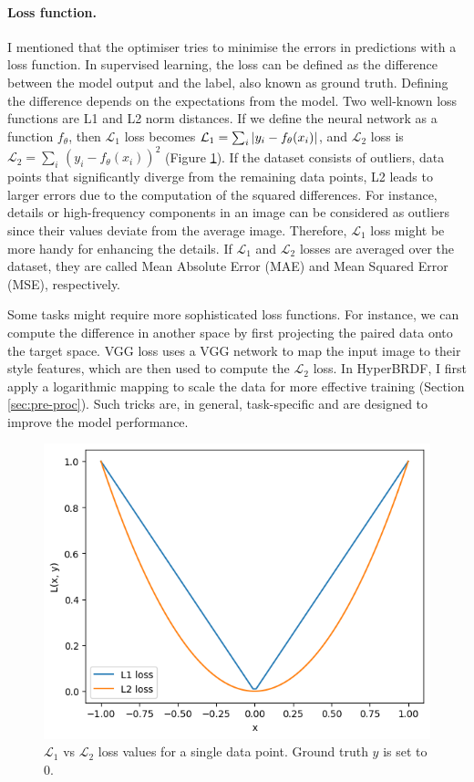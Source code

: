 \paragraph{Loss function.} I mentioned that the optimiser tries to minimise the errors in predictions with a loss function. In supervised learning, the loss can be defined as the difference between the model output and the label, also known as ground truth. Defining the difference depends on the expectations from the model. Two well-known loss functions are L1 and L2 norm distances. If we define the neural network as a function $f_\theta$, then $\mathcal{L}_{1}$ loss becomes $\mathcal{L}_{1} = \sum_i \,\lvert y_i - f_\theta(x_i)\rvert$, and $\mathcal{L}_{2}$ loss is $\mathcal{L}_{2} = \sum_i \, (y_i - f_\theta(x_i))^2$ (Figure \ref{fig:l1vsl2loss}).  If the dataset consists of outliers, data points that significantly diverge from the remaining data points, L2 leads to larger errors due to the computation of the squared differences. For instance, details or high-frequency components in an image can be considered as outliers since their values deviate from the average image. Therefore, $\mathcal{L}_{1}$ loss might be more handy for enhancing the details. If $\mathcal{L}_{1}$ and $\mathcal{L}_{2}$ losses are averaged over the dataset, they are called Mean Absolute Error (\gls{MAE}) and Mean Squared Error (\gls{MSE}), respectively.

Some tasks might require more sophisticated loss functions. For instance, we can compute the difference in another space by first projecting the paired data onto the target space. VGG loss \cite{johnson2016perceptuallossesrealtimestyle} uses a VGG network to map the input image to their style features, which are then used to compute the $\mathcal{L}_{2}$ loss. In HyperBRDF, I first apply a logarithmic mapping to scale the data for more effective training (Section \ref{sec:pre-proc}). Such tricks are, in general, task-specific and are designed to improve the model performance.


\begin{figure}[ht]
  \centering
   \includegraphics[width=0.6\linewidth]{Images/l1vsl2loss.png}
   \caption{$\mathcal{L}_{1}$ vs $\mathcal{L}_{2}$ loss values for a single data point. Ground truth $y$ is set to 0.}
   \label{fig:l1vsl2loss}
\end{figure}

